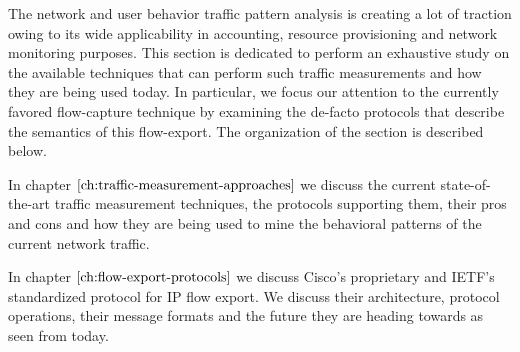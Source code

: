 The network and user behavior traffic pattern analysis is creating a lot of traction owing to its wide applicability in accounting, resource provisioning and network monitoring purposes. This section is dedicated to perform an exhaustive study on the available techniques that can perform such traffic measurements and how they are being used today. In particular, we focus our attention to the currently favored flow-capture technique by examining the de-facto protocols that describe the semantics of this flow-export. The organization of the section is described below.

\vspace{50pt}

In chapter $\ref{ch:traffic-measurement-approaches}$ we discuss the current state-of-the-art traffic measurement techniques, the protocols supporting them, their pros and cons and how they are being used to mine the behavioral patterns of the current network traffic. 

In chapter $\ref{ch:flow-export-protocols}$ we discuss Cisco's proprietary and \ac{IETF}'s standardized protocol for \ac{IP} flow export. We discuss their architecture, protocol operations, their message formats and the future they are heading towards as seen from today.

